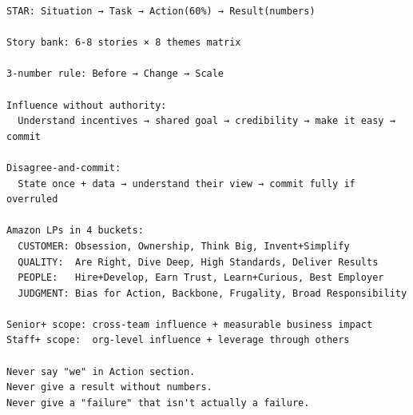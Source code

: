 \documentclass[11pt]{article}
\begin{document}
\setcodelang{}

\begin{verbatim}
STAR: Situation → Task → Action(60%) → Result(numbers)

Story bank: 6-8 stories × 8 themes matrix

3-number rule: Before → Change → Scale

Influence without authority:
  Understand incentives → shared goal → credibility → make it easy → commit

Disagree-and-commit:
  State once + data → understand their view → commit fully if overruled

Amazon LPs in 4 buckets:
  CUSTOMER: Obsession, Ownership, Think Big, Invent+Simplify
  QUALITY:  Are Right, Dive Deep, High Standards, Deliver Results
  PEOPLE:   Hire+Develop, Earn Trust, Learn+Curious, Best Employer
  JUDGMENT: Bias for Action, Backbone, Frugality, Broad Responsibility

Senior+ scope: cross-team influence + measurable business impact
Staff+ scope:  org-level influence + leverage through others

Never say "we" in Action section.
Never give a result without numbers.
Never give a "failure" that isn't actually a failure.
\end{verbatim}
\end{document}
